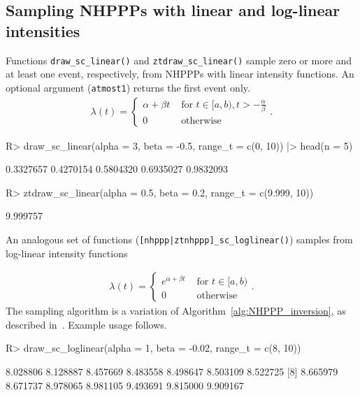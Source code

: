\documentclass[10pt,letterpaper]{article}
\newcommand{\fct}[1]{\texttt{#1()}}
\begin{document}
\subsection{Sampling NHPPPs with linear and log-linear intensities}\label{sec:sample-nhppp-special}

Functions \fct{draw\_sc\_linear} and \fct{ztdraw\_sc\_linear} sample zero or more and at least one event, respectively, from NHPPPs with linear intensity functions. An optional argument (\texttt{atmost1}) returns the first event only.
\begin{align*}
    \lambda(t) =
    \begin{cases}
        \alpha + \beta t &\text{ for } t \in [a, b), t>-\frac{\alpha}{\beta} \\
        0 &\textrm{ otherwise}
    \end{cases}.
\end{align*}

\begin{Schunk}
\begin{Sinput}
R> draw_sc_linear(alpha = 3, beta = -0.5, range_t = c(0, 10)) |> head(n = 5)
\end{Sinput}
\begin{Soutput}
[1] 0.3327657 0.4270154 0.5804320 0.6935027 0.9832093
\end{Soutput}
\begin{Sinput}
R> ztdraw_sc_linear(alpha = 0.5, beta = 0.2, range_t = c(9.999, 10))
\end{Sinput}
\begin{Soutput}
[1] 9.999757
\end{Soutput}
\end{Schunk}

An analogous set of functions (\fct{[nhppp|ztnhppp]\_sc\_loglinear}) samples from log-linear intensity functions

\begin{align*}
    \lambda(t) =
    \begin{cases}
        e^{\alpha + \beta t} &\text{ for } t \in [a, b) \\
        0 &\textrm{ otherwise}
    \end{cases}.
\end{align*}
The sampling algorithm is a variation of Algorithm~\ref{alg:NHPPP_inversion}, as described in~\cite{lewis1976linear}. Example usage follows.
\begin{Schunk}
\begin{Sinput}
R> draw_sc_loglinear(alpha = 1, beta = -0.02, range_t = c(8, 10))
\end{Sinput}
\begin{Soutput}
 [1] 8.028806 8.128887 8.457669 8.483558 8.498647 8.503109 8.522725
 [8] 8.665979 8.671737 8.978065 8.981105 9.493691 9.815000 9.909167
\end{Soutput}
\end{Schunk}
\end{document}
